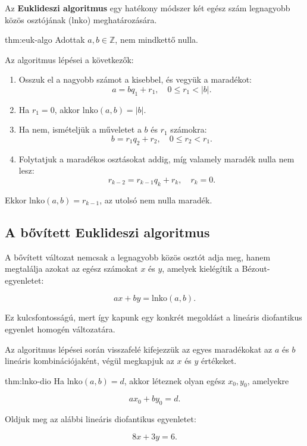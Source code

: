 Az \textbf{Euklideszi algoritmus} egy hatékony módszer két egész szám
legnagyobb közös osztójának ($\mathrm{lnko}$) meghatározására.
\begin{theorem}{thm:euk-algo}
Adottak $a,b\in\mathbb{Z}$, nem mindkettő nulla.

Az algoritmus lépései a következők:
\begin{enumerate}
\item Osszuk el a nagyobb számot a kisebbel, és vegyük a maradékot: 
\[
a=bq_{1}+r_{1},\quad0\le r_{1}<|b|.
\]
\item Ha $r_{1}=0$, akkor $\mathrm{lnko}(a,b)=|b|$. 
\item Ha nem, ismételjük a műveletet a $b$ és $r_{1}$ számokra: 
\[
b=r_{1}q_{2}+r_{2},\quad0\le r_{2}<r_{1}.
\]
\item Folytatjuk a maradékos osztásokat addig, míg valamely maradék nulla
nem lesz: 
\[
r_{k-2}=r_{k-1}q_{k}+r_{k},\quad r_{k}=0.
\]
\end{enumerate}
Ekkor $\mathrm{lnko}(a,b)=r_{k-1}$, az utolsó nem nulla maradék. 
\end{theorem}


\subsection*{A bővített Euklideszi algoritmus}

A bővített változat nemcsak a legnagyobb közös osztót adja meg, hanem
megtalálja azokat az egész számokat $x$ és $y$, amelyek kielégítik
a Bézout-egyenletet:

\[
ax+by=\mathrm{lnko}(a,b).
\]

Ez kulcsfontosságú, mert így kapunk egy konkrét megoldást a lineáris
diofantikus egyenlet homogén változatára.

\medskip{}

Az algoritmus lépései során visszafelé kifejezzük az egyes maradékokat
az $a$ és $b$ lineáris kombinációjaként, végül megkapjuk az $x$
és $y$ értékeket.

\medskip{}

\begin{theorem}{thm:lnko-dio}
Ha $\mathrm{lnko}(a,b)=d$, akkor léteznek olyan egész $x_{0},y_{0}$,
amelyekre

\[
ax_{0}+by_{0}=d.
\]
\end{theorem}

\begin{problem}
Oldjuk meg az alábbi lineáris diofantikus egyenletet:

\[
8x+3y=6.
\]
\end{problem}

